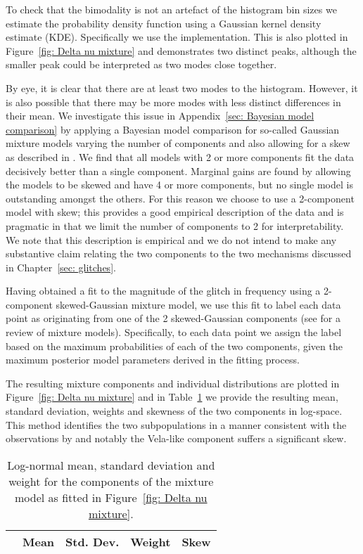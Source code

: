 \documentclass[../full_thesis/full_thesis.tex]{subfiles}
\newcommand{\thisdir}{../glitches_in_CGW}
\begin{document}
To check that the bimodality is not an artefact of the histogram bin sizes we
estimate the probability density function using a Gaussian kernel density
estimate (KDE). Specifically we use the \citet*{Scipy} implementation. This is
also plotted in Figure~\ref{fig: Delta nu mixture} and demonstrates two distinct
peaks, although the smaller peak could be interpreted as two modes close together.

By eye, it is clear that there are at least two modes to the histogram. However,
it is also possible that there may be more modes with less distinct differences
in their mean. We investigate this issue in Appendix~\ref{sec: Bayesian model
comparison} by applying a Bayesian model comparison for so-called Gaussian
mixture models varying the number of components and also allowing for a skew as
described in \citet{Ohagan1976}.  We find that all models with 2 or more
components fit the data decisively better than a single component. Marginal
gains are found by allowing the models to be skewed and have 4 or more
components, but no single model is outstanding amongst the others. For this
reason we choose to use a 2-component model with skew; this provides a good
empirical description of the data and is pragmatic in that we limit the number
of components to 2 for interpretability. We note that this description is
empirical and we do not intend to make any substantive claim relating the two
components to the two mechanisms discussed in Chapter~\ref{sec: glitches}.

Having obtained a fit to the magnitude of the glitch in frequency using a
2-component skewed-Gaussian mixture model, we use this fit to label each data
point as originating from one of the 2 skewed-Gaussian components (see
\citet{gelman2013bayesian} for a review of mixture models). Specifically, to
each data point we assign the label based on the maximum probabilities of each
of the two components, given the maximum posterior model parameters derived in
the fitting process.

The resulting mixture components and individual
distributions are plotted in Figure~\ref{fig: Delta nu mixture} and in
Table~\ref{tab: mixture components} we provide the resulting mean, standard
deviation, weights and skewness of the two components in log-space.
This method identifies the two subpopulations in a manner consistent with the
observations by \citet{Espinoza2011} and notably the Vela-like component suffers
a significant skew.

\begin{table}[htb]
\begin{tabular}{lcccc}
& Mean &Std. Dev. & Weight & Skew \\ \hline

\end{tabular}
\caption{Log-normal mean, standard deviation and weight for the components of
the mixture model as fitted in Figure~\ref{fig: Delta nu mixture}.}
\label{tab: mixture components}
\end{table}
\end{document}
